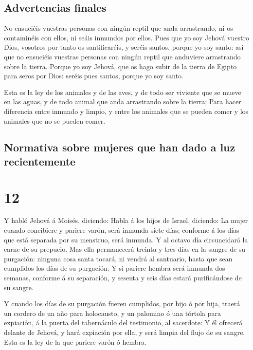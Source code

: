 \hypertarget{advertencias-finales}{%
\subsection{Advertencias finales}\label{advertencias-finales}}

 No ensuciéis vuestras personas con ningún reptil que
anda arrastrando, ni os contaminéis con ellos, ni seáis inmundos por
ellos.  Pues que yo soy Jehová vuestro Dios, vosotros por
tanto os santificaréis, y seréis santos, porque yo soy santo: así que no
ensuciéis vuestras personas con ningún reptil que anduviere arrastrando
sobre la tierra.  Porque yo soy Jehová, que os hago subir
de la tierra de Egipto para seros por Dios: seréis pues santos, porque
yo soy santo.

 Esta es la ley de los animales y de las aves, y de todo
ser viviente que se mueve en las aguas, y de todo animal que anda
arrastrando sobre la tierra;  Para hacer diferencia entre
inmundo y limpio, y entre los animales que se pueden comer y los
animales que no se pueden comer.

\hypertarget{normativa-sobre-mujeres-que-han-dado-a-luz-recientemente}{%
\subsection{Normativa sobre mujeres que han dado a luz
recientemente}\label{normativa-sobre-mujeres-que-han-dado-a-luz-recientemente}}

\hypertarget{section-11}{%
\section{12}\label{section-11}}

 Y habló Jehová á Moisés, diciendo:  Habla á
los hijos de Israel, diciendo: La mujer cuando concibiere y pariere
varón, será inmunda siete días; conforme á los días que está separada
por su menstruo, será inmunda.  Y al octavo día
circuncidará la carne de su prepucio.  Mas ella
permanecerá treinta y tres días en la sangre de su purgación: ninguna
cosa santa tocará, ni vendrá al santuario, hasta que sean cumplidos los
días de su purgación.  Y si pariere hembra será inmunda
dos semanas, conforme á su separación, y sesenta y seis días estará
purificándose de su sangre.

 Y cuando los días de su purgación fueren cumplidos, por
hijo ó por hija, traerá un cordero de un año para holocausto, y un
palomino ó una tórtola para expiación, á la puerta del tabernáculo del
testimonio, al sacerdote:  Y él ofrecerá delante de
Jehová, y hará expiación por ella, y será limpia del flujo de su sangre.
Esta es la ley de la que pariere varón ó hembra.

